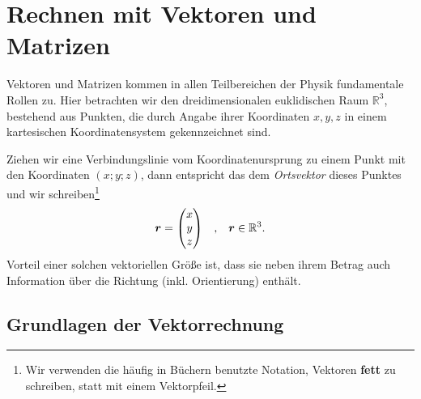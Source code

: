 \section{Rechnen mit Vektoren und Matrizen}

Vektoren und Matrizen kommen in allen Teilbereichen der Physik fundamentale Rollen zu. Hier betrachten wir den dreidimensionalen euklidischen Raum $\mathbb{R}^3$, bestehend aus Punkten, die durch Angabe ihrer Koordinaten $x,y,z$ in einem kartesischen Koordinatensystem gekennzeichnet sind. 

\begin{wrapfigure}{r}{5cm}
    \centering
    \vspace{-5mm}
    \vspace{-5mm}
\end{wrapfigure}
Ziehen wir eine Verbindungslinie vom Koordinatenursprung zu einem Punkt mit den Koordinaten $(x;y;z)$, dann entspricht das dem \emph{Ortsvektor} dieses Punktes und wir schreiben\footnote{Wir verwenden die häufig in Büchern benutzte Notation, Vektoren \textbf{fett} zu schreiben, statt mit einem Vektorpfeil.}
\begin{align}
    \bm{r} = \mqty(x\\y\\z) \qq{,} \bm{r} \in \mathbb{R}^3.
\end{align}
Vorteil einer solchen vektoriellen Größe ist, dass sie neben ihrem Betrag auch Information über die Richtung (inkl. Orientierung) enthält.

\subsection{Grundlagen der Vektorrechnung}

